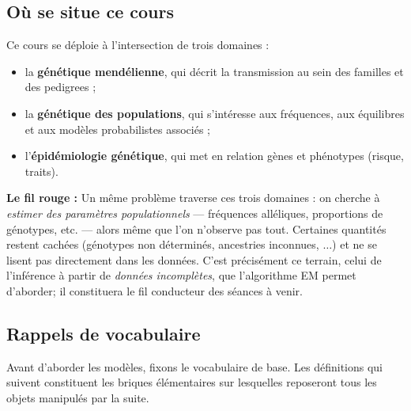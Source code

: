 \subsection*{Où se situe ce cours}

Ce cours se déploie à l'intersection de trois domaines :

\begin{itemize}
  \item la \textbf{génétique mendélienne}, qui décrit la transmission au sein des
        familles et des pedigrees ;
  \item la \textbf{génétique des populations}, qui s'intéresse aux fréquences,
        aux équilibres et aux modèles probabilistes associés ;
  \item l'\textbf{épidémiologie génétique}, qui met en relation gènes et
        phénotypes (risque, traits).
\end{itemize}

\textbf{Le fil rouge : } Un même problème traverse ces trois domaines : on cherche à \textit{estimer des
paramètres populationnels} — fréquences alléliques, proportions de génotypes, etc. — alors même que l'on n'observe pas tout. Certaines quantités restent cachées (génotypes non déterminés, ancestries inconnues, $\dots$) et ne se lisent pas directement dans les données. C'est précisément ce terrain, celui de l'inférence à partir de \textit{données incomplètes}, que l'algorithme EM permet d'aborder; il constituera le fil conducteur des séances à venir.


\subsection*{Rappels de vocabulaire}

Avant d'aborder les modèles, fixons le vocabulaire de base. Les définitions qui suivent constituent les briques élémentaires sur lesquelles reposeront tous les objets manipulés par la suite.


